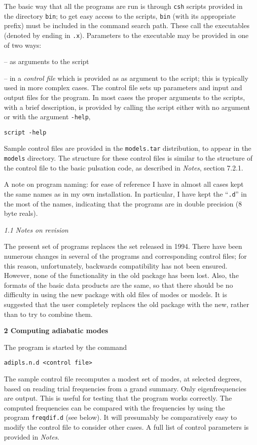 The basic way that all the programs are run is through {\tt csh}
scripts provided in the directory {\tt bin};
to get easy access to the scripts, {\tt bin}
(with its appropriate prefix) must be included in the 
command search path.
These call the executables (denoted by ending in {\tt .x}).
Parameters to the executable may be provided in one of two ways:
\medskip
\item{--} as arguments to the script
\item{--} in a {\it control file} which is provided as as argument 
to the script; this is typically used in more complex cases.
The control file sets up parameters and input and output files
for the program.
\medskip\noindent
In most cases the proper arguments to the scripts, with a brief
description, is provided by calling the script either
with no argument or with the argument {\tt -help},

{\tt script -help}


Sample control files are provided in the {\tt models.tar}
distribution, to appear in the {\tt models} directory.
The structure for these control files is similar to the
structure of the control file to the basic pulsation code,
as described in {\it Notes}, section 7.2.1.

A note on program naming: for ease of reference I have in almost
all cases kept the same names as in my own installation.
In particular, I have kept the ``{\tt .d}'' in the most of the names,
indicating that the programs are in double precision (8 byte reals).

\subsect
{\it 1.1 Notes on revision}

The present set of programs replaces the set released in 1994.
There have been numerous changes in several of the programs and
corresponding control files; for this reason, unfortunately,
backwards compatibility has not been ensured.
However, none of the functionality in the old package has been lost.
Also, the formats of the basic data products are the same,
so that there should be no difficulty in using the new 
package with old files of modes or models.
It is suggested that the user completely replaces the old package with the
new, rather than to try to combine them.
\newpage

\mainsect
{\bf 2 Computing adiabatic modes}

The program is started by the command

{\tt adipls.n.d <control file>}

\noindent
The sample control file recomputes a modest set of modes, at selected 
degrees, based on reading trial frequencies from a grand summary.
Only eigenfrequencies are output.
This is useful for testing that the program works correctly. 
The computed frequencies can be compared with the frequencies
by using the program {\tt freqdif.d} (see below).
It will presumably be comparatively easy to modify the
control file to consider other cases.
A full list of control parameters is provided in {\it Notes}.

